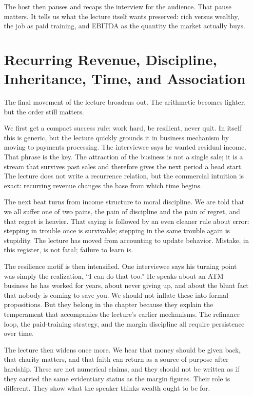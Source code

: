 The host then pauses and recaps the interview for the audience. That pause matters. It tells us what the lecture itself wants preserved: rich versus wealthy, the job as paid training, and EBITDA as the quantity the market actually buys.

\section{Recurring Revenue, Discipline, Inheritance, Time, and Association}

The final movement of the lecture broadens out. The arithmetic becomes lighter, but the order still matters.

We first get a compact success rule: work hard, be resilient, never quit. In itself this is generic, but the lecture quickly grounds it in business mechanism by moving to payments processing. The interviewee says he wanted residual income. That phrase is the key. The attraction of the business is not a single sale; it is a stream that survives past sales and therefore gives the next period a head start. The lecture does not write a recurrence relation, but the commercial intuition is exact: recurring revenue changes the base from which time begins.

The next beat turns from income structure to moral discipline. We are told that we all suffer one of two pains, the pain of discipline and the pain of regret, and that regret is heavier. That saying is followed by an even cleaner rule about error: stepping in trouble once is survivable; stepping in the same trouble again is stupidity. The lecture has moved from accounting to update behavior. Mistake, in this register, is not fatal; failure to learn is.

The resilience motif is then intensified. One interviewee says his turning point was simply the realization, ``I can do that too.'' He speaks about an ATM business he has worked for years, about never giving up, and about the blunt fact that nobody is coming to save you. We should not inflate these into formal propositions. But they belong in the chapter because they explain the temperament that accompanies the lecture's earlier mechanisms. The refinance loop, the paid-training strategy, and the margin discipline all require persistence over time.

The lecture then widens once more. We hear that money should be given back, that charity matters, and that faith can return as a source of purpose after hardship. These are not numerical claims, and they should not be written as if they carried the same evidentiary status as the margin figures. Their role is different. They show what the speaker thinks wealth ought to be for.


